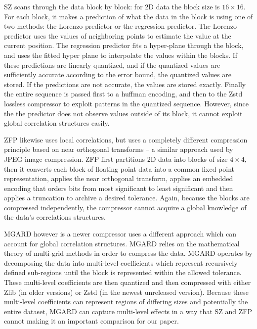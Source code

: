 \documentclass[conference]{IEEEtran}
\begin{document}
SZ scans through the data block by block: for 2D data the block size is $16 \times 16$. For each block, it makes a prediction of what the data in the block is using one of two methods: the Lorenzo predictor or the regression predictor.  The Lorenzo predictor uses the values of neighboring points to estimate the value at the current position.  The regression predictor fits a hyper-plane through the block, and uses the fitted hyper plane to interpolate the values within the blocks.  If these predictions are linearly quantized, and if the quantized values are sufficiently accurate according to the error bound, the quantized values are stored.  If the predictions are not accurate, the values are stored exactly.
Finally the entire sequence is passed first to a huffman encoding, and then to the Zstd lossless compressor to exploit patterns in the quantized sequence.
However, since the the predictor does not observe values outside of its block, it cannot exploit global correlation structures easily.

ZFP likewise uses local correlations, but uses a completely different compression principle based on near orthogonal transforms -- a similar approach used by JPEG image compression.
ZFP first partitions 2D data into blocks of size $4 \times 4$, then it converts each block of floating point data into a common fixed point representation, applies the near orthogonal transform, applies an embedded encoding that orders bits from most significant to least significant and then applies a truncation to archive a desired tolerance.
Again, because the blocks are compressed independently, the compressor cannot acquire a global knowledge of the data's correlations structures.

MGARD however is a newer compressor uses a different approach which can account for global correlation structures.
MGARD relies on the mathematical theory of multi-grid methods in order to compress the data.
MGARD operates by decomposing the data into multi-level coefficients which represent recursively defined sub-regions until the block is represented within the allowed tolerance.
These multi-level coefficients are then quantized and then compressed with either Zlib (in older versions) or Zstd (in the newest unreleased version).
Because these multi-level coefficients can represent regions of differing sizes and potentially the entire dataset, MGARD can capture multi-level effects in a way that SZ and ZFP cannot making it an important comparison for our paper.
\end{document}
